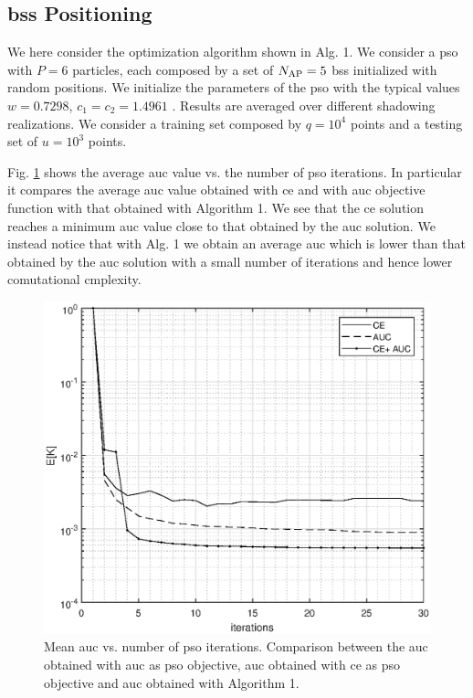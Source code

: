 \documentclass[conference]{IEEEtran}
\begin{document}
\subsection{\acp{bs} Positioning}
We here consider the optimization algorithm shown in Alg. 1. We consider a \ac{pso} with $P=6$ particles, each composed by a set of $N_{\rm AP}=5$ \acp{bs} initialized with random positions. We initialize the parameters of the \ac{pso} with the typical values $w=0.7298$, $c_1=c_2=1.4961$ \cite{Kennedy-11}. Results are averaged over different shadowing realizations. We consider a training set composed by $q=10^4$ points and a testing set of $u=10^3$ points.

Fig. \ref{fig:CEvsAUC} shows the average \ac{auc} value vs. the number of \ac{pso} iterations. In particular it compares the average \ac{auc} value obtained with \ac{ce} and with \ac{auc} objective function with that obtained with Algorithm 1. We see that the \ac{ce} solution reaches a minimum \ac{auc} value close to that obtained by the \ac{auc} solution. We instead notice that with Alg. 1 we obtain an average \ac{auc} which is lower than that obtained by the \ac{auc} solution with a small number of iterations and hence lower comutational cmplexity.

\begin{figure}[t]
    \centering
    \includegraphics[width=0.9\columnwidth]{CE_vsAUC.eps}
    \caption{Mean \ac{auc} vs. number of \ac{pso} iterations. Comparison between the \ac{auc} obtained with \ac{auc} as \ac{pso} objective, \ac{auc} obtained with \ac{ce} as \ac{pso} objective and \ac{auc} obtained with Algorithm 1. }
    \label{fig:CEvsAUC}
\end{figure}
\end{document}
